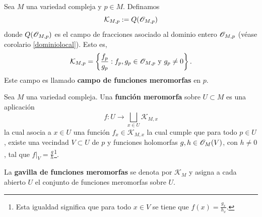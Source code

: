 \begin{definition}
	Sea $M$ una variedad compleja y $p\in M$. Definamos
	\begin{equation*}
		\mathcal{K}_{M,p}:=Q(\mathscr{O}_{M,p})
	\end{equation*}
	donde $Q(\mathscr{O}_{M,p})$ es el campo de fracciones asociado al dominio entero $\mathscr{O}_{M,p}$ (véase corolario \ref{dominiolocal}). Esto es,
	\begin{equation*}
		\mathcal{K}_{M,p}=\left\{ \frac{f_p}{g_p}:f_p,g_p\in\mathscr{O}_{M,p}\text{ y }g_p\neq 0\right\}.
	\end{equation*}
	Este campo es llamado \textbf{campo de funciones meromorfas} en $p$.
\end{definition}  

\begin{definition}
	Sea $M$ una variedad compleja. Una \textbf{función meromorfa} sobre $U\subset M$ es una aplicación
	\begin{equation*}
		f:U\longrightarrow \bigsqcup_{x\in U}\mathcal{K}_{M,x}
	\end{equation*}
	la cual asocia a $x\in U$ una función $f_x\in \mathcal{K}_{M,x}$ la cual cumple que para todo $p\in U$, existe una vecindad $V\subset U$ de $p$ y funciones holomorfas $g,h\in\mathscr{O}_M(V)$, con $h\neq 0$, tal que $f|_V=\frac{g}{h}$\footnote{Esta igualdad significa que para todo $x\in V$ se tiene que $f(x)=\frac{g_x}{h_x}$.}.
\end{definition}

La \textbf{gavilla de funciones meromorfas} se denota por $\mathcal{K}_{M}$ y asigna a cada abierto $U$ el conjunto de funciones meromorfas sobre $U$.

